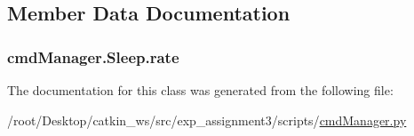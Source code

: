 \subsection{Member Data Documentation}
\subsubsection[{\texorpdfstring{rate}{rate}}]{\setlength{\rightskip}{0pt plus 5cm}cmd\+Manager.\+Sleep.\+rate}\hypertarget{classcmdManager_1_1Sleep_a0b3670d1b3a8cbbeb03935273320b858}{}\label{classcmdManager_1_1Sleep_a0b3670d1b3a8cbbeb03935273320b858}


The documentation for this class was generated from the following file\+:\begin{DoxyCompactItemize}
\item 
/root/\+Desktop/catkin\+\_\+ws/src/exp\+\_\+assignment3/scripts/\hyperlink{cmdManager_8py}{cmd\+Manager.\+py}\end{DoxyCompactItemize}

